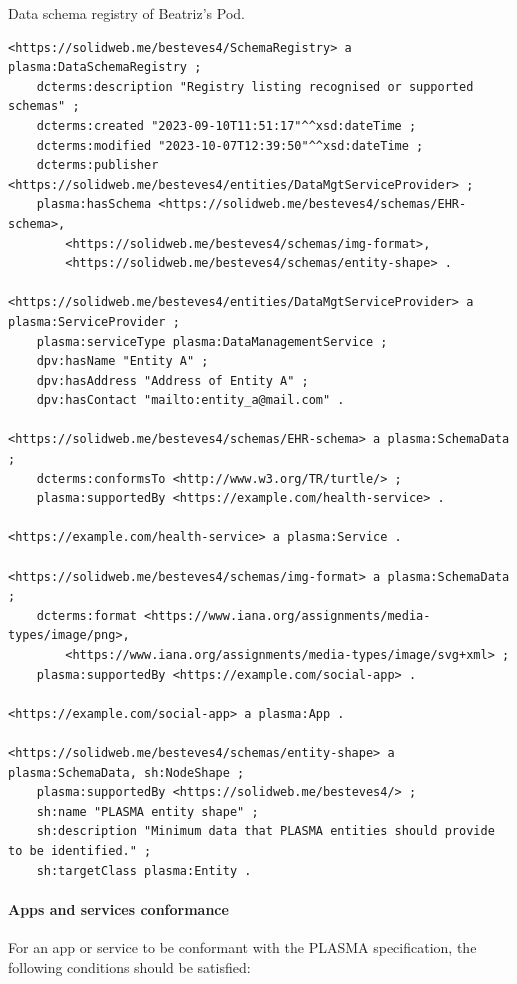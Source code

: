 \begin{listing}[htp]
\caption{Data schema registry of Beatriz's Pod.}
\label{list:plasma_dataschemaregistry}
\begin{verbatim}
<https://solidweb.me/besteves4/SchemaRegistry> a plasma:DataSchemaRegistry ;
    dcterms:description "Registry listing recognised or supported schemas" ;
    dcterms:created "2023-09-10T11:51:17"^^xsd:dateTime ;
    dcterms:modified "2023-10-07T12:39:50"^^xsd:dateTime ;
    dcterms:publisher <https://solidweb.me/besteves4/entities/DataMgtServiceProvider> ;
    plasma:hasSchema <https://solidweb.me/besteves4/schemas/EHR-schema>,
        <https://solidweb.me/besteves4/schemas/img-format>,
        <https://solidweb.me/besteves4/schemas/entity-shape> .

<https://solidweb.me/besteves4/entities/DataMgtServiceProvider> a plasma:ServiceProvider ;
    plasma:serviceType plasma:DataManagementService ;
    dpv:hasName "Entity A" ;
    dpv:hasAddress "Address of Entity A" ;
    dpv:hasContact "mailto:entity_a@mail.com" .

<https://solidweb.me/besteves4/schemas/EHR-schema> a plasma:SchemaData ;
    dcterms:conformsTo <http://www.w3.org/TR/turtle/> ;
    plasma:supportedBy <https://example.com/health-service> .

<https://example.com/health-service> a plasma:Service .

<https://solidweb.me/besteves4/schemas/img-format> a plasma:SchemaData ;
    dcterms:format <https://www.iana.org/assignments/media-types/image/png>,
        <https://www.iana.org/assignments/media-types/image/svg+xml> ;
    plasma:supportedBy <https://example.com/social-app> .

<https://example.com/social-app> a plasma:App .

<https://solidweb.me/besteves4/schemas/entity-shape> a plasma:SchemaData, sh:NodeShape ;
    plasma:supportedBy <https://solidweb.me/besteves4/> ;
    sh:name "PLASMA entity shape" ;
    sh:description "Minimum data that PLASMA entities should provide to be identified." ;
    sh:targetClass plasma:Entity .
\end{verbatim}
\end{listing}


\paragraph{Apps and services conformance}
For an app or service to be conformant with the PLASMA specification, the following conditions should be satisfied:

